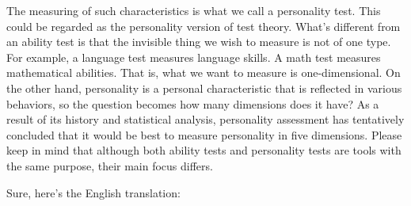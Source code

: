 \documentclass{ltjbook}
\begin{document}
The measuring of such characteristics is what we call a personality test. This could be regarded as the personality version of test theory. What's different from an ability test is that the invisible thing we wish to measure is not of one type. For example, a language test measures language skills. A math test measures mathematical abilities. That is, what we want to measure is one-dimensional. On the other hand, personality is a personal characteristic that is reflected in various behaviors, so the question becomes how many dimensions does it have? As a result of its history and statistical analysis, personality assessment has tentatively concluded that it would be best to measure personality in five dimensions. Please keep in mind that although both ability tests and personality tests are tools with the same purpose, their main focus differs.


Sure, here's the English translation:
\end{document}
